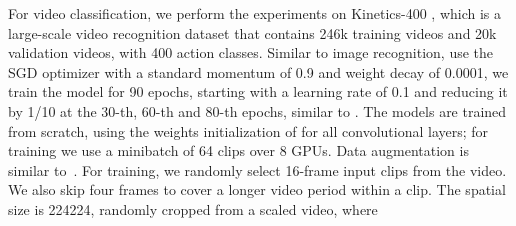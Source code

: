 \documentclass{article}
\begin{document}
For video classification, we perform the experiments on Kinetics-400 \cite{kay2017kinetics}, which is a large-scale video recognition dataset that contains  246k training videos and 20k validation videos, with 400 action classes. Similar to image recognition, use the SGD optimizer with a standard momentum of 0.9 and weight decay of 0.0001,  we train the model for 90 epochs, starting with a learning rate of 0.1 and reducing it by 1/10 at the 30-th, 60-th and 80-th epochs, similar to \cite{he2016deep,goyal2017accurate}. The models are trained from scratch, using the weights initialization of \cite{he2015delving} for all convolutional layers; for training we use a minibatch of 64 clips over 8 GPUs. Data augmentation is similar to~\cite{simonyan2014very,wang2018non}. For training,  we randomly select 16-frame input clips from the video.  We also skip four frames to cover a longer video period within a clip. The spatial size is 224224, randomly cropped from a scaled video, where
\end{document}
